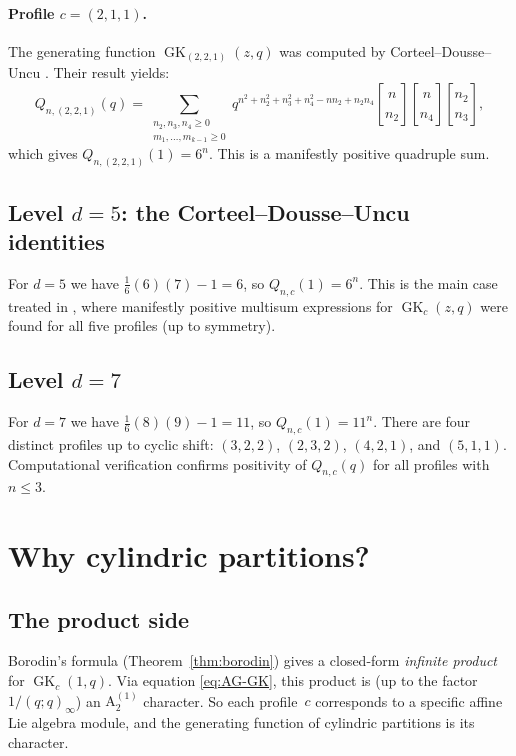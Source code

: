 \documentclass[11pt]{article}
\theoremstyle{plain}
\theoremstyle{definition}
\newcommand{\GK}{\operatorname{GK}}
\newcommand{\qpoch}[2]{(#1;#2)_\infty}
\newcommand{\qbin}[2]{\genfrac{[}{]}{0pt}{}{#1}{#2}}
\begin{document}
\paragraph{Profile $c = (2,1,1)$.}
The generating function $\GK_{(2,2,1)}(z,q)$ was computed by
Corteel--Dousse--Uncu \cite[Theorem~3.3]{CDU}.
Their result yields:
\[
  Q_{n,(2,2,1)}(q) = \sum_{\substack{n_2, n_3, n_4 \geq 0 \\
  m_1, \ldots, m_{k-1} \geq 0}}
  q^{n^2 + n_2^2 + n_3^2 + n_4^2 - nn_2 + n_2n_4}
  \qbin{n}{n_2} \qbin{n}{n_4} \qbin{n_2}{n_3},
\]
which gives $Q_{n,(2,2,1)}(1) = 6^n$.
This is a manifestly positive quadruple sum.


\subsection{Level $d = 5$: the Corteel--Dousse--Uncu identities}

For $d = 5$ we have $\frac{1}{6}(6)(7) - 1 = 6$, so $Q_{n,c}(1) = 6^n$.
This is the main case treated in \cite{CDU}, where manifestly positive
multisum expressions for $\GK_c(z,q)$ were found for all five profiles
(up to symmetry).


\subsection{Level $d = 7$}

For $d = 7$ we have $\frac{1}{6}(8)(9) - 1 = 11$, so $Q_{n,c}(1) = 11^n$.
There are four distinct profiles up to cyclic shift: $(3,2,2)$, $(2,3,2)$,
$(4,2,1)$, and $(5,1,1)$.  Computational verification confirms positivity
of $Q_{n,c}(q)$ for all profiles with $n \leq 3$.


\section{Why cylindric partitions?}
\label{sec:why-cpp}

\subsection{The product side}

Borodin's formula (Theorem~\ref{thm:borodin}) gives a closed-form
\emph{infinite product} for $\GK_c(1,q)$.  Via equation \eqref{eq:AG-GK},
this product is (up to the factor $1/\qpoch{q}{q}$) an $\mathrm{A}_2^{(1)}$
character.  So each profile~$c$ corresponds to a specific affine Lie algebra
module, and the generating function of cylindric partitions is its character.
\end{document}
